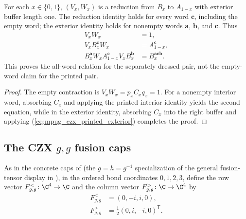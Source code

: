\begin{lemma}
    \label{thm:mpug_czx_dressed_action_reduction}
    \leanok
    For each $x\in\{0,1\}$, $(V_x,W_x)$ is a reduction from $B_x$
    to $A_{1-x}$ with exterior buffer length one. The reduction identity
    holds for every word $\mathbf c$, including the empty word; the exterior
    identity holds for nonempty words $\mathbf a$, $\mathbf b$, and
    $\mathbf c$. Thus
    \begin{align}
        V_xW_x                & =1,                                 \\
        V_xB_x^{\mathbf c}W_x & =A_{1-x}^{\mathbf c},               \\
        B_x^{\mathbf a}W_xA_{1-x}^{\mathbf c}V_xB_x^{\mathbf b}
                              & =B_x^{\mathbf a\mathbf c\mathbf b}.
        \label{eq:mpug_czx_dressed_action_reduction}
    \end{align}
    This proves the all-word relation for the separately dressed pair,
    not the empty-word claim for the printed pair.
\end{lemma}
\begin{proof}\leanok
    The empty contraction is $V_xW_x=p_xC_xq_x=1$. For a nonempty
    interior word, absorbing $C_x$ and applying the printed interior
    identity yields the second equation, while in the exterior identity,
    absorbing $C_x$ into the right buffer and applying
    (\ref{eq:mpug_czx_printed_exterior}) completes the proof.
\end{proof}

\subsection{The CZX \texorpdfstring{$g,g$}{g,g} fusion caps}

\begin{definition}
    \label{def:mpug_czx_fusion_caps}
    \leanok
    As in the concrete caps of
    \cite[lines~4671--4689]{FrancoRubio2025MPUGauging} (the $g=h=g^{-1}$
    specialization of the general fusion-tensor display in
    \cite[lines~2000--2037]{FrancoRubio2025MPUGauging}), in the ordered bond
    coordinates $0,1,2,3$, define the row vector
    $F^<_{g,g}\colon\C^4\to\C$ and the column vector
    $F^>_{g,g}\colon\C\to\C^4$ by
    \begin{align}
        F^<_{g,g} & =(0,-i,i,0),                     \\
        F^>_{g,g} & =\tfrac12(0,i,-i,0)^{\mathsf T}.
    \end{align}
\end{definition}


